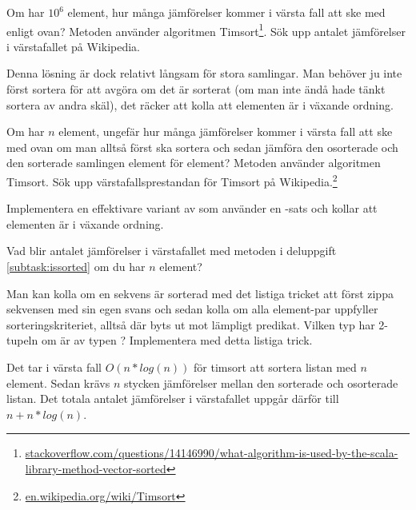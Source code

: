\Subtask\Pen  Om  har $10^6$ element, hur många jämförelser kommer i värsta fall att ske med  enligt ovan? Metoden  använder algoritmen Timsort\footnote{\href{http://stackoverflow.com/questions/14146990/what-algorithm-is-used-by-the-scala-library-method-vector-sorted}{stackoverflow.com/questions/14146990/what-algorithm-is-used-by-the-scala-library-method-vector-sorted}}. Sök upp antalet jämförelser i värstafallet på Wikipedia.

Denna lösning är dock relativt långsam för stora samlingar. Man behöver ju inte först sortera  för att avgöra om det är sorterat (om man inte ändå hade tänkt sortera av andra skäl), det räcker att kolla att elementen är i växande ordning.

\Subtask\Pen  Om  har $n$ element, ungefär hur många jämförelser kommer i värsta fall att ske med  ovan om man alltså först ska sortera och sedan jämföra den osorterade och den sorterade samlingen element för element? Metoden  använder algoritmen Timsort. Sök upp värstafallsprestandan för Timsort på Wikipedia.\footnote{\href{https://en.wikipedia.org/wiki/Timsort}{en.wikipedia.org/wiki/Timsort}}

\Subtask\label{subtask:issorted} Implementera en effektivare variant av  som använder en -sats och kollar att elementen är i växande ordning.

\Subtask\Pen Vad blir antalet jämförelser i värstafallet med metoden i deluppgift \ref{subtask:issorted} om du har $n$ element?


\Subtask \label{subtask:isSorted-zip} Man kan kolla om en sekvens är sorterad med det listiga tricket att först zippa sekvensen med sin egen svans och sedan kolla om alla element-par uppfyller sorteringskriteriet, alltså  där  byts ut mot lämpligt predikat. Vilken typ har 2-tupeln  om  är av typen ? Implementera  med detta listiga trick. 

\SOLUTION


\TaskSolved \what



\SubtaskSolved

Det tar i värsta fall $O(n*log(n))$ för timsort att sortera listan med $n$ element. Sedan krävs $n$ stycken jämförelser mellan den sorterade och osorterade listan. Det totala antalet jämförelser i värstafallet uppgår därför till $n + n*log(n)$.

